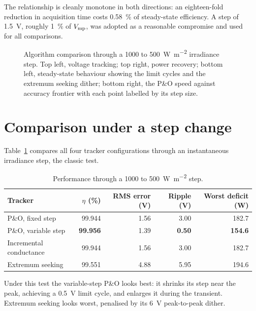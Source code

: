 The relationship is cleanly monotone in both directions: an eighteen-fold
reduction in acquisition time costs \SI{0.58}{\percent} of steady-state
efficiency. A step of \SI{1.5}{\volt}, roughly \SI{1}{\percent} of $V_{\mathrm{mp}}$, was
adopted as a reasonable compromise and used for all comparisons.

\begin{figure}[htbp]
\centering
{}
\caption[MPPT algorithm comparison]{Algorithm comparison through a \SI{1000}{} to \SI{500}{\watt\per\square\metre} irradiance step. Top left, voltage tracking; top right, power recovery; bottom left, steady-state behaviour showing the limit cycles and the extremum seeking dither; bottom right, the P\&O speed against accuracy frontier with each point labelled by its step size.}
\label{fig:mpptcompare}
\end{figure}

\section{Comparison under a step change}

Table~\ref{tab:stepcompare} compares all four tracker configurations through an
instantaneous irradiance step, the classic test.

\begin{table}[htbp]
\centering
\caption{Performance through a \SI{1000}{} to \SI{500}{\watt\per\square\metre} step.}
\label{tab:stepcompare}
\begin{tabular}{@{}lrrrr@{}}
\toprule
Tracker & $\eta$ (\si{\percent}) & RMS error (\si{\volt}) & Ripple (\si{\volt}) & Worst deficit (\si{\watt}) \\
\midrule
P\&O, fixed step        & 99.944 & 1.56 & 3.00 & 182.7 \\
P\&O, variable step     & \textbf{99.956} & 1.39 & \textbf{0.50} & \textbf{154.6} \\
Incremental conductance & 99.944 & 1.56 & 3.00 & 182.7 \\
Extremum seeking        & 99.551 & 4.88 & 5.95 & 194.6 \\
\bottomrule
\end{tabular}
\end{table}

Under this test the variable-step P\&O looks best: it shrinks its step near the
peak, achieving a \SI{0.5}{\volt} limit cycle, and enlarges it during the
transient. Extremum seeking looks worst, penalised by its \SI{6}{\volt}
peak-to-peak dither.

